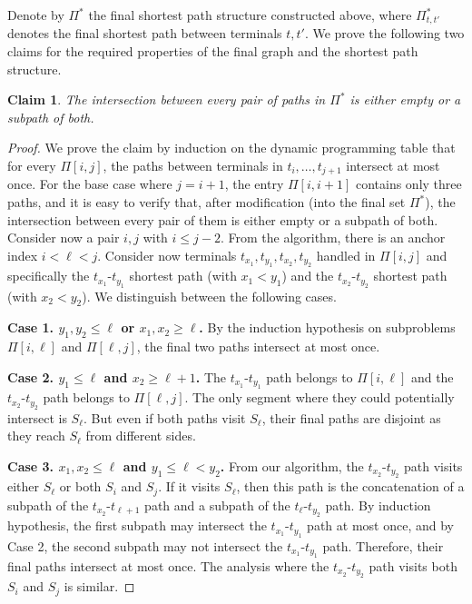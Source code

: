 \documentclass[11pt]{article}
\newtheorem{claim}[theorem]{Claim}
\begin{document}
Denote by $\Pi^*$ the final shortest path structure constructed above, where $\Pi^*_{t,t'}$ denotes the final shortest path between terminals $t,t'$.
We prove the following two claims for the required properties of the final graph and the shortest path structure.

\begin{claim} \label{clm:intersect-once}
The intersection between every pair of paths in $\Pi^*$ is either empty or a subpath of both.
\end{claim}

\begin{proof}
We prove the claim by induction on the dynamic programming table that for every $\Pi[i,j]$, the paths between terminals in $t_i,\dots,t_{j+1}$ intersect at most once.
For the base case where $j = i + 1$, the entry $\Pi[i,i+1]$ contains only three paths, and it is easy to verify that, after modification (into the final set $\Pi^*$), the intersection between every pair of them is either empty or a subpath of both.
%
Consider now a pair $i,j$ with $i\le j-2$.
From the algorithm, there is an anchor index $i<\ell<j$. 
Consider now terminals $t_{x_1},t_{y_1},t_{x_2},t_{y_2}$ handled in $\Pi[i,j]$ and specifically the $t_{x_1}$-$t_{y_1}$ shortest path (with $x_1<y_1$) and the $t_{x_2}$-$t_{y_2}$ shortest path (with $x_2<y_2$).  We distinguish between the following cases.

\textbf{Case 1. $y_1,y_2\le \ell$ or $x_1,x_2\ge \ell$.} By the induction hypothesis on subproblems $\Pi[i,\ell]$ and $\Pi[\ell,j]$, the final two paths intersect at most once. 

\textbf{Case 2. $y_1 \le \ell$ and $x_2 \ge \ell+1$.} The $t_{x_1}$-$t_{y_1}$ path belongs to $\Pi[i,\ell]$ and the $t_{x_2}$-$t_{y_2}$ path belongs to $\Pi[\ell,j]$. The only segment where they could potentially intersect is $S_{\ell}$. But even if both paths visit $S_{\ell}$, their final paths are disjoint as they reach $S_\ell$ from different sides.

\textbf{Case 3. $x_1,x_2 \le \ell$ and $y_1 \le \ell< y_2$.} From our algorithm, the $t_{x_2}$-$t_{y_2}$ path visits either $S_{\ell}$ or both $S_i$ and $S_j$. If it visits $S_{\ell}$, then this path is the concatenation of a subpath of the $t_{x_2}$-$t_{\ell+1}$ path and a subpath of the $t_{\ell}$-$t_{y_2}$ path. By induction hypothesis, the first subpath may intersect the $t_{x_1}$-$t_{y_1}$ path at most once, and by Case 2, the second subpath may not intersect the $t_{x_1}$-$t_{y_1}$ path. Therefore, their final paths intersect at most once. The analysis where the $t_{x_2}$-$t_{y_2}$ path visits both $S_i$ and $S_j$ is similar.


\end{proof}
\end{document}
